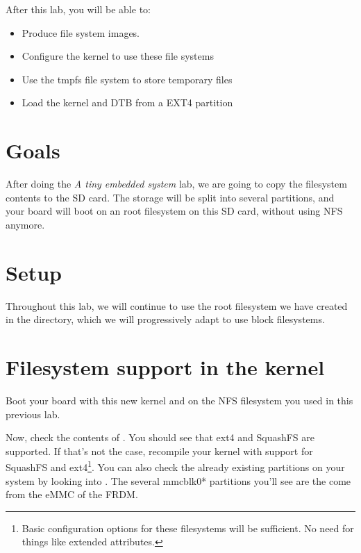 
After this lab, you will be able to:
\begin{itemize}
\item Produce file system images.
\item Configure the kernel to use these file systems
\item Use the tmpfs file system to store temporary files
\item Load the kernel and DTB from a EXT4 partition
\end{itemize}

\section{Goals}

After doing the {\em A tiny embedded system} lab, we are going to copy
the filesystem contents to the SD card. The storage will be
split into several partitions, and your board will boot
on an root filesystem on this SD card, without using NFS anymore.

\section{Setup}

Throughout this lab, we will continue to use the root filesystem we
have created in the 
directory, which we will progressively adapt to use block filesystems.

\section{Filesystem support in the kernel}

Boot your board with this new kernel and on the NFS filesystem you
used in this previous lab.

Now, check the contents of . You should see
that ext4 and SquashFS are supported. If that's not the case, recompile
your kernel with support for SquashFS and ext4\footnote{Basic configuration
options for these filesystems will be sufficient. No need for things like
extended attributes.}.
You can also check the already existing partitions on your system by looking
into . The several mmcblk0* partitions you'll see are
the come from the eMMC of the FRDM.

